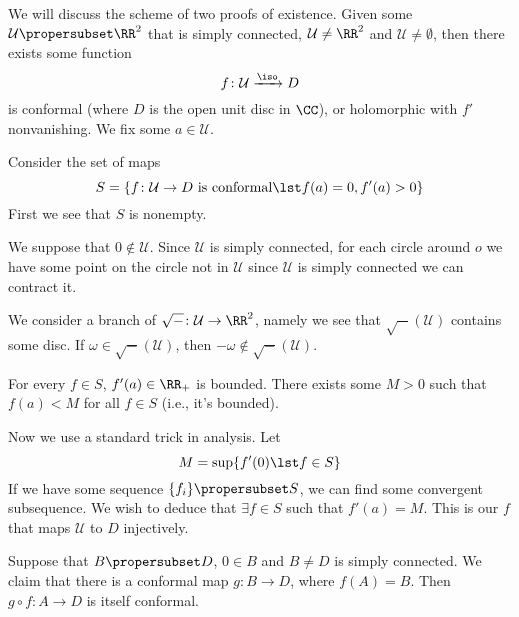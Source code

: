 We will discuss the scheme of two proofs of existence. Given some
$\mathcal{U}\propersubset\RR^{2}$ that is simply connected,
$\mathcal{U}\not=\RR^{2}$ and $\mathcal{U}\not=\emptyset$, then
there exists some function
\begin{equation}
f\colon\mathcal{U}\xrightarrow{\iso}D
\end{equation}
is conformal (where $D$ is the open unit disc in $\CC$), or
holomorphic with $f'$ nonvanishing. We fix some
$a\in\mathcal{U}$.

Consider the set of maps 
\begin{equation}
S=\{f\colon\mathcal{U}\to D\mbox{ is conformal}\lst f(a)=0,
f'(a)>0\}
\end{equation}
First we see that $S$ is nonempty.

We suppose that $0\notin\mathcal{U}$. Since $\mathcal{U}$ is
simply connected, for each circle around $o$ we have some point
on the circle not in $\mathcal{U}$ since $\mathcal{U}$ is simply
connected we can contract it.

We consider a branch of $\sqrt{-}\colon\mathcal{U}\to\RR^{2}$,
namely we see that $\sqrt{-}(\mathcal{U})$ contains some disc. If
$\omega\in\sqrt{-}(\mathcal{U})$, then
$-\omega\notin\sqrt{-}(\mathcal{U})$. 

For every $f\in S$, $f'(a)\in\RR_{+}$ is bounded. There exists
some $M>0$ such that $f(a)<M$ for all $f\in S$ (i.e., it's
bounded).

Now we use a standard trick in analysis. Let 
\begin{equation}
M=\sup\{f'(0)\lst f\in S\}
\end{equation}
If we have some sequence $\{f_{i}\}\propersubset S$, we can find
some convergent subsequence. We wish to deduce that $\exists f\in
S$ such that $f'(a)=M$. This is our $f$ that maps $\mathcal{U}$
to $D$ injectively.

Suppose that $B\propersubset D$, $0\in B$ and $B\not=D$ is simply
connected. We claim that there is a conformal map $g\colon B\to
D$, where $f(A)=B$. Then $g\circ f\colon A\to D$ is itself
conformal. 

